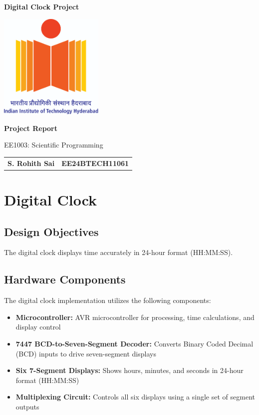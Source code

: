 \documentclass[12pt]{article}
\begin{document}
\begin{titlepage}
    \centering
    {\Huge \bfseries  Digital Clock Project \par}
    \vspace{1cm}
    \includegraphics[width=5cm]{figs/logo.jpg} %
    \vspace{1cm}
    
    {\Large \bfseries Project Report \par}
    \vspace{0.5cm}
    
    {\large EE1003: Scientific Programming \par}
    \vspace{2cm}
    \begin{tabular}{ll}
    \textbf{S. Rohith Sai} & \textbf{EE24BTECH11061}  \end{tabular}
\vspace{1cm}
\end{titlepage}
\newpage
\tableofcontents
\newpage

\section{\textbf{Digital Clock}}
\subsection{Design Objectives}
The digital clock displays time accurately in 24-hour format (HH:MM:SS).

\subsection{Hardware Components}
The digital clock implementation utilizes the following components:

\begin{itemize}
    \item \textbf{Microcontroller:} AVR microcontroller for processing, time calculations, and display control
    \item \textbf{7447 BCD-to-Seven-Segment Decoder:} Converts Binary Coded Decimal (BCD) inputs to drive seven-segment displays
    \item \textbf{Six 7-Segment Displays:} Shows hours, minutes, and seconds in 24-hour format (HH:MM:SS)
    \item \textbf{Multiplexing Circuit:} Controls all six displays using a single set of segment outputs
\end{itemize}
\end{document}
